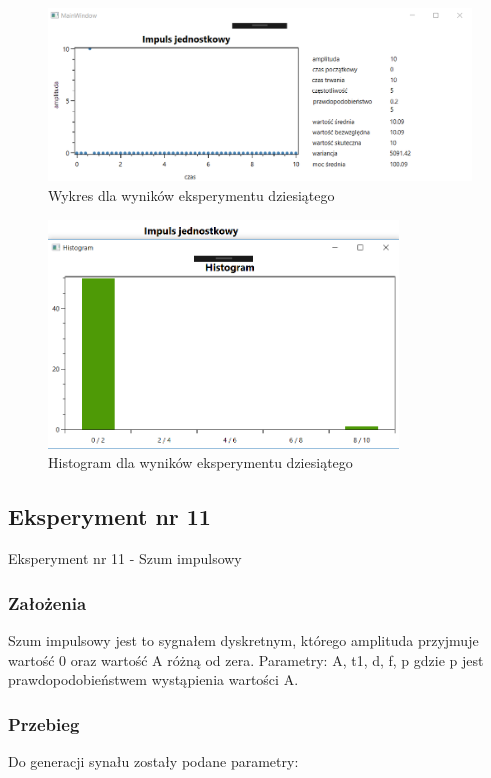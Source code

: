 \documentclass[12pt]{article}
\begin{document}
\begin{figure}[h!]
 \centering
 \includegraphics[width=12.3cm]{ImpulsJed.PNG}
 \vspace{-0.3cm}
 \caption{Wykres dla wyników eksperymentu dziesiątego}
 \label{Wykres dla wyników eksperymentu dziesiątego}
\end{figure}
\newpage
\begin{figure}[h!]
 \centering
 \includegraphics[width=9.3cm]{ImpulsJedHist.PNG}
 \vspace{-0.3cm}
 \caption{Histogram dla wyników eksperymentu dziesiątego}
 \label{Histogram dla wyników eksperymentu dziesiątego}
\end{figure}

\subsection{Eksperyment nr 11}

Eksperyment nr 11 - Szum impulsowy
\subsubsection{Założenia}
Szum impulsowy jest to sygnałem dyskretnym, którego amplituda przyjmuje wartość 0 oraz wartość A różną od zera.
Parametry: A, t1, d, f, p gdzie p jest prawdopodobieństwem wystąpienia wartości A.

\subsubsection{Przebieg}
Do generacji synału zostały podane parametry:
\end{document}
